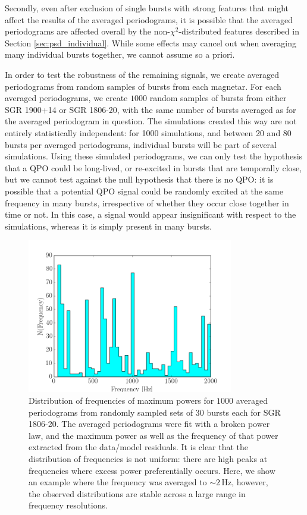 \documentclass[numberedappendix]{emulateapj}
\newcommand{\hz}{\,\mathrm{Hz}}
\begin{document}
Secondly, even after exclusion of single bursts with strong features that might affect the results of the averaged periodograms, it is possible that the averaged periodograms are affected overall by the non-$\chi^2$-distributed features described in Section \ref{sec:psd_individual}. While some effects may cancel out when averaging many individual bursts together, we cannot assume so a priori. 

In order to test the robustness of the remaining signals, we create averaged periodograms from random samples of bursts from each magnetar. For each averaged periodograms, we create $1000$ random samples of bursts from either SGR 1900+14 or SGR 1806-20, with the same number of bursts averaged as for the averaged periodogram in question. The simulations created this way are not entirely statistically independent: for 1000 simulations, and between 20 and 80 bursts per averaged periodograms, individual bursts will be part of several simulations. Using these simulated periodograms, we can only test the hypothesis that a QPO could be long-lived, or re-excited in bursts that are temporally close, but we cannot test against the null hypothesis that there is no QPO: it is possible that a potential QPO signal could be randomly excited at the same frequency in many bursts, irrespective of whether they occur close together in time or not. In this case, a signal would appear insignificant with respect to the simulations, whereas it is simply present in many bursts. 

\begin{figure}[htbp]
\begin{center}
\includegraphics[width=9cm]{frequency_dist_example.png}
\caption{Distribution of frequencies of maximum powers for $1000$ averaged periodograms from randomly sampled sets of $30$ bursts each for SGR 1806-20. The averaged periodograms were fit with a broken power law, and the maximum power as well as the frequency of that power extracted from the data/model residuals. It is clear that the distribution of frequencies is not uniform: there are high peaks at frequencies where excess power preferentially occurs.  Here, we show an example where the frequency was averaged to $\sim 2 \hz$, however, the observed distributions are stable across a large range in frequency resolutions.}
\label{fig:psd_avg_freqdist}
\end{center}
\end{figure}
\end{document}
